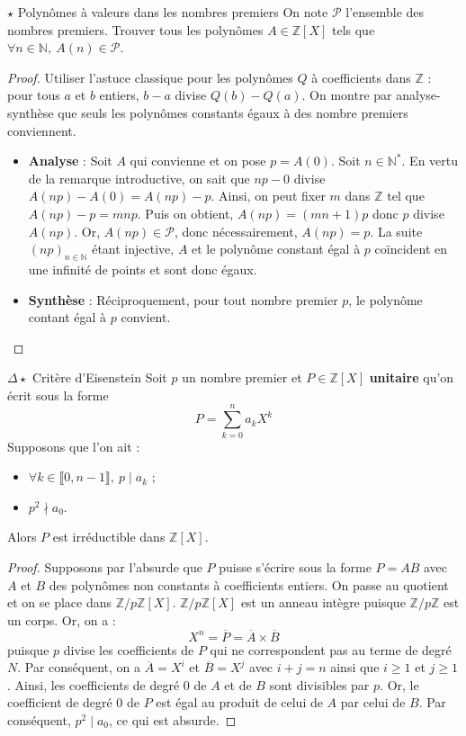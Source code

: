 \documentclass[french,a4paper]{article}
\newcommand{\N}{\mathbb{N}}
\newcommand{\Z}{\mathbb{Z}}
\newcommand{\st}{^*}
\theoremstyle{plain}
\theoremstyle{definition}
\theoremstyle{remark}
\begin{document}
\begin{ex}[Morlot]{$\star$ Polynômes à valeurs dans les nombres premiers}
	On note $\mathcal{P}$ l'ensemble des nombres premiers. Trouver tous les polynômes $A \in \Z[X]$ tels que $\forall n \in \N, \ A(n) \in \mathcal{P}$.
\end{ex}
\begin{proof}
	Utiliser l'astuce classique pour les polynômes $Q$ à coefficients dans $\Z$ : pour tous $a$ et $b$ entiers, $b-a$ divise $Q(b)-Q(a)$. On montre par analyse-synthèse que seuls les polynômes constants égaux à des nombre premiers conviennent.
	\begin{itemize}
		\item \textbf{Analyse} : Soit $A$ qui convienne et on pose $p=A(0)$. Soit $n \in \N\st$. En vertu de la remarque introductive, on sait que $np-0$ divise $A(np)-A(0)=A(np)-p$. Ainsi, on peut fixer $m$ dans $\Z$ tel que $A(np)-p=mnp$. Puis on obtient, $A(np)=(mn+1)p$ donc $p$ divise $A(np)$. Or, $A(np) \in \mathcal{P}$, donc nécessairement, $A(np)=p$. La suite $(np)_{n \in \N}$ étant injective, $A$ et le polynôme constant égal à $p$ coïncident en une infinité de points et sont donc égaux.
		\item \textbf{Synthèse} : Réciproquement, pour tout nombre premier $p$, le polynôme contant égal à $p$ convient.
	\end{itemize}
\end{proof}

\begin{ex}[Morlot]{$\Delta\star$ Critère d'Eisenstein}
	Soit $p$ un nombre premier et $P\in\Z[X]$ \textbf{unitaire} qu'on écrit sous la forme $$P=\sum_{k=0}^{n}a_kX^k$$ Supposons que l'on ait :
	\begin{itemize}
		\item $\forall k\in\llbracket0,n-1\rrbracket,\ p\mid a_k$ ;
		\item $p^2\nmid a_0$.
	\end{itemize}
	Alors $P$ est irréductible dans $\Z[X]$.
\end{ex}
\begin{proof}
	Supposons par l'absurde que $P$ puisse s'écrire sous la forme $P=AB$ avec $A$ et $B$ des polynômes non constants à coefficients entiers. On passe au quotient et on se place dans $\Z/p\Z[X]$. $\Z/p\Z[X]$ est un anneau intègre puisque $\Z/p\Z$ est un corps. Or, on a : $$X^n=\overline{P}=\overline{A}\times\overline{B}$$ puisque $p$ divise les coefficients de $P$ qui ne correspondent pas au terme de degré $N$. Par conséquent, on a $\overline{A}=X^i$ et $\overline{B}=X^j$ avec $i+j=n$ ainsi que $i\geqslant 1$ et $j\geqslant 1$. Ainsi, les coefficients de degré $0$ de $A$ et de $B$ sont divisibles par $p$. Or, le coefficient de degré $0$ de $P$ est égal au produit de celui de $A$ par celui de $B$. Par conséquent, $p^2\mid a_0$, ce qui est absurde.
\end{proof}
\end{document}
